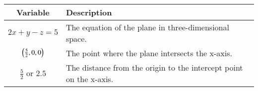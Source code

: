 
    \begin{tabular}{|c|l|}
        \hline
        \textbf{Variable}   & \textbf{Description}                     \\
        \hline
        $2x+y-z=5$            & The equation of the plane in three-dimensional space.                \\
        \hline
        $\left(\frac{5}{2},0,0\right)$ & The point where the plane intersects the x-axis. \\
        \hline
        $\frac{5}{2}$ or $2.5$  &  The distance from the origin to the intercept point on the x-axis.      \\
        \hline
    \end{tabular}

